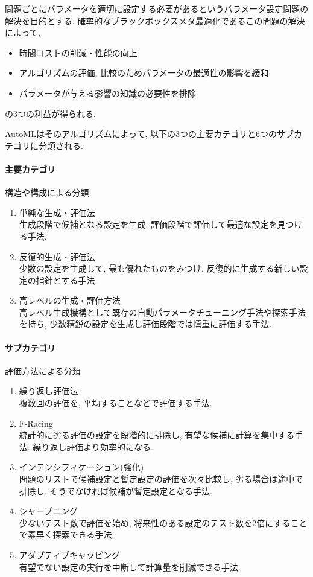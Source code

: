 \documentclass[twocolumn]{jarticle}     %
\begin{document}
問題ごとにパラメータを適切に設定する必要があるというパラメータ設定問題の解決を目的とする.
確率的なブラックボックスメタ最適化であるこの問題の解決によって,
\begin{itemize}
  \item 時間コストの削減・性能の向上
  \item アルゴリズムの評価, 比較のためパラメータの最適性の影響を緩和
  \item パラメータが与える影響の知識の必要性を排除
\end{itemize}
の3つの利益が得られる.

AutoMLはそのアルゴリズムによって, 以下の3つの主要カテゴリと6つのサブカテゴリに分類される\cite{SurveyAutoML}.

\paragraph{主要カテゴリ}
構造や構成による分類
\begin{enumerate}
  \item 単純な生成・評価法 \\
  生成段階で候補となる設定を生成, 評価段階で評価して最適な設定を見つける手法.

  \item 反復的生成・評価法 \\
  少数の設定を生成して, 最も優れたものをみつけ, 反復的に生成する新しい設定の指針とする手法.

  \item 高レベルの生成・評価方法 \\
  高レベル生成機構として既存の自動パラメータチューニング手法や探索手法を持ち,
  少数精鋭の設定を生成し評価段階では慎重に評価する手法.
\end{enumerate}

\paragraph{サブカテゴリ}
評価方法による分類
\begin{enumerate}
  \item 繰り返し評価法 \\
  複数回の評価を, 平均することなどで評価する手法.

  \item F-Racing \\
  統計的に劣る評価の設定を段階的に排除し, 有望な候補に計算を集中する手法. 繰り返し評価より効率的になる.

  \item インテンシフィケーション(強化) \\
  問題のリストで候補設定と暫定設定の評価を次々比較し, 劣る場合は途中で排除し, そうでなければ候補が暫定設定となる手法.

  \item シャープニング \\
  少ないテスト数で評価を始め, 将来性のある設定のテスト数を2倍にすることで素早く探索できる手法.

  \item アダプティブキャッピング  \\
  有望でない設定の実行を中断して計算量を削減できる手法.
\end{enumerate}
\end{document}
